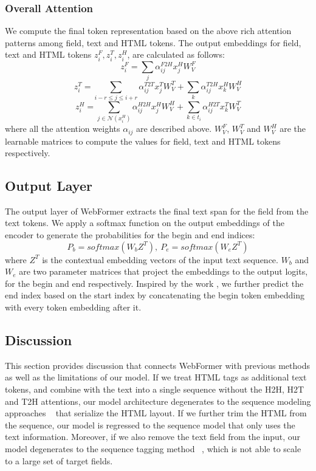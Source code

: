 \documentclass[sigconf]{acmart}
\begin{document}
\subsubsection{Overall Attention}
We compute the final token representation based on the above rich attention patterns among field, text and HTML tokens.
The output embeddings for field, text and HTML tokens $z_i^F, z_i^T, z_i^H$, are calculated as follows:
\[z_i^F = \sum_{j} \alpha^{F2H}_{ij} x_j^H W_V^F\]
\[z_i^T = \sum_{i-r\le j\le {i+r}} \alpha^{T2T}_{ij} x_j^T W_V^T + \sum_{k} \alpha^{T2H}_{ij} x_k^H W_V^H\]
\[z_i^H = \sum_{j \in \mathcal{N}(x_i^H)} \alpha^{H2H}_{ij} x_j^H W_V^H + \sum_{k\in t_i} \alpha^{H2T}_{ij} x_k^T W_V^T\]
where all the attention weights $\alpha_{ij}$ are described above. $W_V^F$, $W_V^T$ and $W_V^H$ are the learnable matrices to compute the values for field, text and HTML tokens respectively.

\subsection{Output Layer}
The output layer of WebFormer extracts the final text span for the field from the text tokens. We apply a softmax function on the output embeddings of the encoder to generate the probabilities for the begin and end indices:
\[P_b = softmax(W_bZ^T), \ P_e = softmax(W_eZ^T) \]
where $Z^T$ is the contextual embedding vectors of the input text sequence. $W_b$ and $W_e$ are two parameter matrices that project the embeddings to the output logits, for the begin and end respectively. Inspired by the work \cite{XLNet}, we further predict the end index based on the start index by concatenating the begin token embedding with every token embedding after it.

\subsection{Discussion}
This section provides discussion that connects WebFormer with previous methods as well as the limitations of our model. If we treat HTML tags as additional text tokens, and combine with the text into a single sequence without the H2H, H2T and T2H attentions, our model architecture degenerates to the sequence modeling approaches ~\cite{XuL0HW020,abs-2101-09465} that serialize the HTML layout. If we further trim the HTML from the sequence, our model is regressed to the sequence model \cite{WangYKSSSYE20} that only uses the text information. Moreover, if we also remove the text field from the input, our model degenerates to the sequence tagging method ~\cite{ZhengMD018,Lin0VT20}, which is not able to scale to a large set of target fields.
\end{document}
